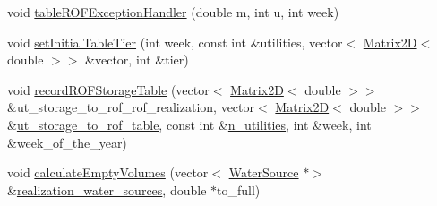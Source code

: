 \begin{DoxyCompactItemize}
\item 
void \mbox{\hyperlink{classContinuityModelROF_a10a8a95f3177d305d3881e654f01d65d}{table\+R\+O\+F\+Exception\+Handler}} (double m, int u, int week)
\item 
void \mbox{\hyperlink{classContinuityModelROF_a0c46d5905f5d0ae2cf0abd0d4653bbc7}{set\+Initial\+Table\+Tier}} (int week, const int \&utilities, vector$<$ \mbox{\hyperlink{classMatrix2D}{Matrix2D}}$<$ double $>$$>$ \&vector, int \&tier)
\item 
void \mbox{\hyperlink{classContinuityModelROF_aa2348a2a5dea751462771ef538243e75}{record\+R\+O\+F\+Storage\+Table}} (vector$<$ \mbox{\hyperlink{classMatrix2D}{Matrix2D}}$<$ double $>$$>$ \&ut\+\_\+storage\+\_\+to\+\_\+rof\+\_\+rof\+\_\+realization, vector$<$ \mbox{\hyperlink{classMatrix2D}{Matrix2D}}$<$ double $>$$>$ \&\mbox{\hyperlink{classContinuityModelROF_ada25d241caf860255ad00097f5e7adb6}{ut\+\_\+storage\+\_\+to\+\_\+rof\+\_\+table}}, const int \&\mbox{\hyperlink{classContinuityModel_a6df6198ebc99a099df08f4b8ce6b52b9}{n\+\_\+utilities}}, int \&week, int \&week\+\_\+of\+\_\+the\+\_\+year)
\item 
void \mbox{\hyperlink{classContinuityModelROF_aa720006d12410fc35b8768eda716c149}{calculate\+Empty\+Volumes}} (vector$<$ \mbox{\hyperlink{classWaterSource}{Water\+Source}} $\ast$$>$ \&\mbox{\hyperlink{classContinuityModelROF_a77048d247b8d1f70fbdd31559b4d3337}{realization\+\_\+water\+\_\+sources}}, double $\ast$to\+\_\+full)
\end{DoxyCompactItemize}
